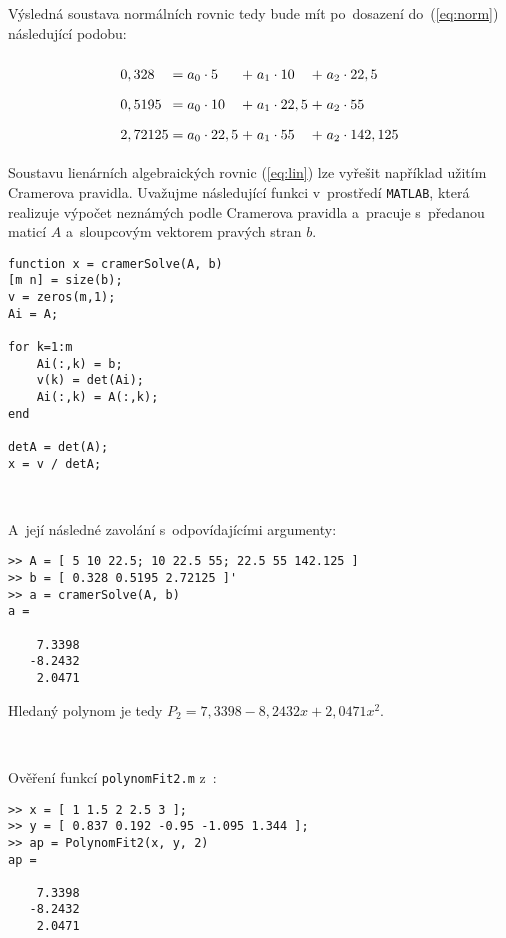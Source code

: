 \documentclass[a4paper,10pt]{article}
\def\doubleunderline#1{\underline{\underline{#1}}}
\begin{document}
\par Výsledná soustava normálních rovnic tedy bude mít po~dosazení do~(\ref{eq:norm})
následující podobu:

\begin{equation}
\label{eq:lin}
\arraycolsep=1.4pt\def\arraystretch{1.8}
\begin{array}{lclclcl}
0,328 & = & a_0\cdot5 & + & a_1\cdot10 & + & a_2\cdot22,5 \\
0,5195 & = & a_0\cdot10 & + & a_1\cdot22,5 & + & a_2\cdot55 \\
2,72125 & = & a_0\cdot22,5 & + & a_1\cdot55 & + & a_2\cdot142,125 \\
\end{array}
\end{equation}

\newpage
\par Soustavu lienárních algebraických rovnic (\ref{eq:lin}) lze vyřešit například užitím
Cramerova pravidla. Uvažujme následující funkci v~prostředí \texttt{MATLAB}, která
realizuje výpočet neznámých podle Cramerova pravidla a~pracuje s~předanou maticí $A$
a~sloupcovým vektorem pravých stran $b$.

\begin{verbatim}
function x = cramerSolve(A, b)
[m n] = size(b);
v = zeros(m,1);
Ai = A;

for k=1:m
    Ai(:,k) = b;
    v(k) = det(Ai);
    Ai(:,k) = A(:,k);
end

detA = det(A);
x = v / detA;
\end{verbatim}

\par ~\\

\par A~její následné zavolání s~odpovídajícími argumenty:\\

\begin{verbatim}
>> A = [ 5 10 22.5; 10 22.5 55; 22.5 55 142.125 ]
>> b = [ 0.328 0.5195 2.72125 ]'
>> a = cramerSolve(A, b)
a =

    7.3398
   -8.2432
    2.0471
\end{verbatim}

\par Hledaný polynom je tedy \doubleunderline{$P_2=7,3398 -8,2432x + 2,0471x^2$}. \\

\par ~ \\
\par Ověření funkcí \texttt{polynomFit2.m}
z~:

\begin{verbatim}
>> x = [ 1 1.5 2 2.5 3 ];
>> y = [ 0.837 0.192 -0.95 -1.095 1.344 ];
>> ap = PolynomFit2(x, y, 2)
ap =

    7.3398
   -8.2432
    2.0471
\end{verbatim}

\end{document}
